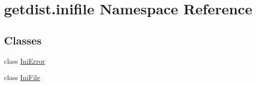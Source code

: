 \hypertarget{namespacegetdist_1_1inifile}{}\section{getdist.\+inifile Namespace Reference}
\label{namespacegetdist_1_1inifile}
\subsection*{Classes}
\begin{DoxyCompactItemize}
\item 
class \mbox{\hyperlink{classgetdist_1_1inifile_1_1IniError}{Ini\+Error}}
\item 
class \mbox{\hyperlink{classgetdist_1_1inifile_1_1IniFile}{Ini\+File}}
\end{DoxyCompactItemize}
